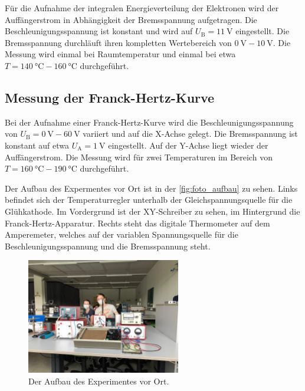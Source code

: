     Für die Aufnahme der integralen Energieverteilung der Elektronen wird der Auffängerstrom in Abhängigkeit der Bremsspannung aufgetragen. 
    Die Beschleunigungsspannung ist konstant und wird auf $U_{\text{B}} = \SI{11}{\volt}$ eingestellt. Die Bremsspannung durchläuft ihren 
    kompletten Wertebereich von $\SI{0}{\volt} - \SI{10}{\volt}$. Die Messung wird einmal bei Raumtemperatur und einmal bei etwa $T = \SI{140}{\celsius} - \SI{160}{\celsius}$
    durchgeführt. 

\subsection{Messung der Franck-Hertz-Kurve}

    Bei der Aufnahme einer Franck-Hertz-Kurve wird die Beschleunigungsspannung von $U_{\text{B}} = \SI{0}{\volt}- \SI{60}{\volt}$ variiert und auf die 
    X-Achse gelegt. Die Bremsspannung ist konstant auf etwa $U_{\text{A}} = \SI{1}{\volt}$ eingestellt. Auf der Y-Achse liegt wieder der Auffängerstrom. 
    Die Messung wird für zwei Temperaturen im Bereich von $T = \SI{160}{\celsius} - \SI{190}{\celsius}$ durchgeführt. 

\noindent Der Aufbau des Expermentes vor Ort ist in der \autoref{fig:foto_aufbau} zu sehen. Links befindet sich der Temperaturregler unterhalb der Gleichspannungsquelle
für die Glühkathode. Im Vordergrund ist der XY-Schreiber zu sehen, im Hintergrund die Franck-Hertz-Apparatur. Rechts steht das digitale Thermometer auf dem Amperemeter, 
welches auf der variablen Spannungsquelle für die Beschleunigungsspannung und die Bremsspannung steht. 

\begin{figure}[H]
    \centering
    \includegraphics[width=0.6\textwidth]{bilder/foto_aufbau.jpeg}
    \caption{Der Aufbau des Experimentes vor Ort.}
    \label{fig:foto_aufbau}
\end{figure}